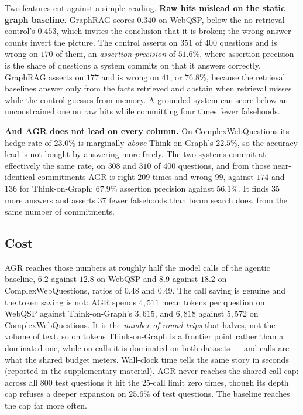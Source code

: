 Two features cut against a simple reading. \textbf{Raw hits mislead on
the static graph baseline.} GraphRAG scores $0.340$ on WebQSP, below the
no-retrieval control's $0.453$, which invites the conclusion that it is
broken; the wrong-answer counts invert the picture. The control asserts
on $351$ of $400$ questions and is wrong on $170$ of them, an
\emph{assertion precision} of $51.6\%$, where assertion precision is the
share of questions a system commits on that it answers correctly.
GraphRAG asserts on $177$ and is wrong on $41$, or $76.8\%$, because the
retrieval baselines answer only from the facts retrieved and abstain
when retrieval misses while the control guesses from memory. A grounded
system can score below an unconstrained one on raw hits while committing
four times fewer falsehoods.

\textbf{And AGR does not lead on every column.} On ComplexWebQuestions
its hedge rate of $23.0\%$ is marginally \emph{above} Think-on-Graph's
$22.5\%$, so the accuracy lead is not bought by answering more freely.
The two systems commit at effectively the same rate, on $308$ and $310$
of $400$ questions, and from those near-identical commitments AGR is
right $209$ times and wrong $99$, against $174$ and $136$ for
Think-on-Graph: $67.9\%$ assertion precision against $56.1\%$. It finds
$35$ more answers and asserts $37$ fewer falsehoods than beam search
does, from the same number of commitments.

\subsection{Cost}\label{sec:cost}

AGR reaches those numbers at roughly half the model calls of the agentic
baseline, $6.2$ against $12.8$ on WebQSP and $8.9$ against $18.2$ on
ComplexWebQuestions, ratios of $0.48$ and $0.49$. The call saving is
genuine and the token saving is not: AGR spends $4{,}511$ mean tokens
per question on WebQSP against Think-on-Graph's $3{,}615$, and $6{,}818$
against $5{,}572$ on ComplexWebQuestions. It is the \emph{number of
round trips} that halves, not the volume of text, so on tokens
Think-on-Graph is a frontier point rather than a dominated one, while on
calls it is dominated on both datasets --- and calls are what the shared
budget meters. Wall-clock time tells the same story in seconds (reported
in the supplementary material). AGR never reaches the shared call cap:
across all $800$ test questions it hit the $25$-call limit zero times,
though its depth cap refuses a deeper expansion on $25.6\%$ of test
questions. The baseline reaches the cap far more often.

